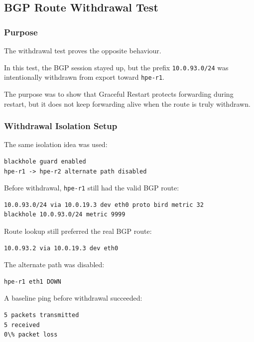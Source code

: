 \subsection{BGP Route Withdrawal Test}

\subsubsection{Purpose}

The withdrawal test proves the opposite behaviour.

In this test, the BGP session stayed up, but the prefix \texttt{10.0.93.0/24} was intentionally withdrawn from export toward \texttt{hpe-r1}.

The purpose was to show that Graceful Restart protects forwarding during restart, but it does not keep forwarding alive when the route is truly withdrawn.

\subsubsection{Withdrawal Isolation Setup}

The same isolation idea was used:

\begin{verbatim}
blackhole guard enabled
hpe-r1 -> hpe-r2 alternate path disabled
\end{verbatim}

Before withdrawal, \texttt{hpe-r1} still had the valid BGP route:

\begin{verbatim}
10.0.93.0/24 via 10.0.19.3 dev eth0 proto bird metric 32
blackhole 10.0.93.0/24 metric 9999
\end{verbatim}

Route lookup still preferred the real BGP route:

\begin{verbatim}
10.0.93.2 via 10.0.19.3 dev eth0
\end{verbatim}

The alternate path was disabled:

\begin{verbatim}
hpe-r1 eth1 DOWN
\end{verbatim}

A baseline ping before withdrawal succeeded:

\begin{verbatim}
5 packets transmitted
5 received
0\% packet loss
\end{verbatim}

